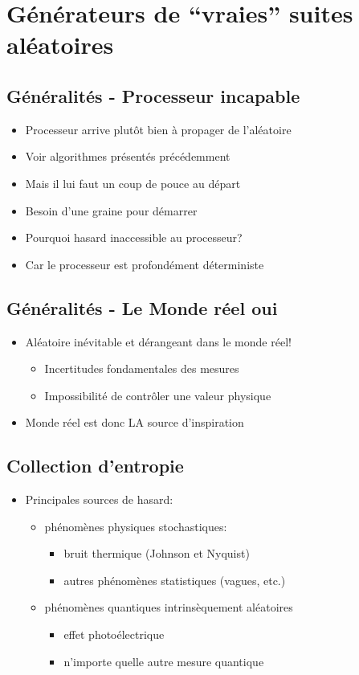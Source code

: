 \documentclass{scrartcl}
\begin{document}
\section{Générateurs de ``vraies'' suites aléatoires}
\subsection{Généralités - Processeur incapable}
 \begin{itemize}
 \item Processeur arrive plutôt bien à propager de l’aléatoire
 \item Voir algorithmes présentés précédemment
 \item Mais il lui faut un coup de pouce au départ
 \item  Besoin d’une graine pour démarrer
 \item Pourquoi hasard inaccessible au processeur?
 \item Car le processeur est profondément déterministe
 \end{itemize}

\subsection{Généralités - Le Monde réel oui}
 \begin{itemize}
 \item Aléatoire inévitable et dérangeant dans le monde réel!
  \begin{itemize}
  \item Incertitudes fondamentales des mesures
  \item Impossibilité de contrôler une valeur physique
  \end{itemize}
 \item Monde réel est donc LA source d’inspiration
 \end{itemize}

\subsection{Collection d'entropie}
 \begin{itemize}
 \item Principales sources de hasard:
  \begin{itemize}
  \item phénomènes physiques stochastiques:
   \begin{itemize}
   \item bruit thermique (Johnson et Nyquist)
   \item autres phénomènes statistiques (vagues, etc.)
   \end{itemize}
  \item phénomènes quantiques intrinsèquement aléatoires
   \begin{itemize}
   \item effet photoélectrique
   \item n’importe quelle autre mesure quantique
   \end{itemize}
  \end{itemize}
 \end{itemize}
\end{document}
